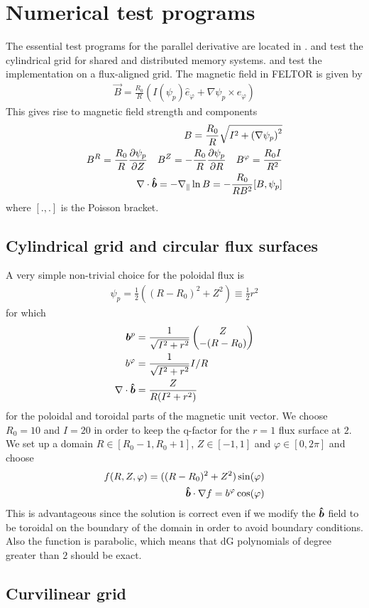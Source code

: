 \section{Numerical test programs}
The essential test programs for the parallel derivative are located in
.
 and  test the cylindrical grid for shared and distributed memory
systems.  and  test the implementation
on a flux-aligned grid.
The magnetic field in FELTOR is given by
\begin{align}
  \vec B = \frac{R_0}{R}( I(\psi_p) \hat e_\varphi + \nabla\psi_p \times\hat e_\varphi)
\end{align}
This gives rise to magnetic field strength and components
\begin{align}
  B = \frac{R_0}{R} \sqrt{ I^2 + \left( \nabla\psi_p \right)^2} \\
  B^R = \frac{R_0}{R}\frac{\partial\psi_p}{\partial Z} \quad
  B^Z = -\frac{R_0}{R}\frac{\partial\psi_p}{\partial R}\quad 
  B^\varphi = \frac{R_0I}{R^2} \\
  \nabla \cdot\bm{\hat{b}} = -\nabla_\parallel \ln B = -\frac{R_0}{RB^2} [B, \psi_p]  
  \label{}
\end{align}
where $[.,.]$ is the Poisson bracket.
\subsection{Cylindrical grid and circular flux surfaces}
A very simple non-trivial choice for the poloidal flux is
\begin{align}
  \psi_p = \frac{1}{2} \left( (R-R_0)^2 + Z^2 \right) \equiv \frac{1}{2} r^2
  \label{eq:circular}
\end{align}
for which
\begin{align}
  {\boldsymbol{b}}^p &= \frac{1}{\sqrt{I^2 + r^2}} \begin{pmatrix} Z \\ -(R-R_0)\end{pmatrix} \\
  b^\varphi &= \frac{1}{\sqrt{I^2 + r^2}} I/R \\
  \nabla\cdot \bm{\hat{b}} &= \frac{Z}{R(I^2 + r^2)}
  \label{}
\end{align}
for the poloidal and toroidal parts of the magnetic unit vector.
We choose $R_0 = 10$ and $I=20$ in order to keep the q-factor for the $r=1$ flux surface at $2$.
We set up a domain
$R\in[R_0-1, R_0+1]$,
$Z\in[-1,1]$ and
$\varphi \in [0,2\pi]$ and choose
\begin{align}
  f(R,Z,\varphi) = ((R-R_0)^2 + Z^2)\sin(\varphi)\\
  \bm{\hat{b}} \cdot \nabla f= b^\varphi \cos(\varphi)
  \label{}
\end{align}
This is advantageous since the solution is correct even if we modify the $\bm{\hat{b}}$ field
to be toroidal on the boundary of the domain in order to avoid boundary conditions.
Also the function is parabolic, which means that dG polynomials of degree greater than $2$
should be exact.
\subsection{Curvilinear grid}










